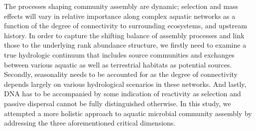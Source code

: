\documentclass[12pt,a4paper]{article} %
\begin{document}
The processes shaping community assembly are dynamic; selection and mass effects will vary in relative importance along complex aquatic networks as a function of the degree of connectivity to surrounding ecosystems, and upstream history. In order to capture the shifting balance of assembly processes and link those to the underlying rank abundance structure, we firstly need to examine a true hydrologic continuum that includes source communities and exchanges between various aquatic as well as terrestrial habitats as potential sources. Secondly, seasonality needs to be accounted for as the degree of connectivity depends largely on various hydrological scenarios in these networks. And lastly, DNA has to be accompanied by some indication of reactivity as selection and passive dispersal cannot be fully distinguished otherwise. In this study, we attempted a more holistic approach to aquatic microbial community assembly by addressing the three aforementioned critical dimensions.

\end{document}

